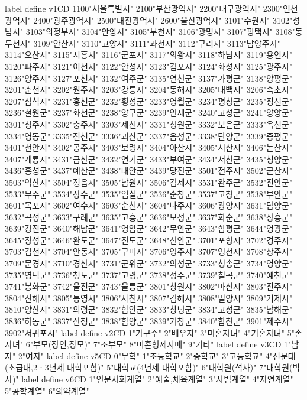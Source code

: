         label define v1CD 1100"서울특별시" 2100"부산광역시" 2200"대구광역시" 2300"인천광역시" 2400"광주광역시" 2500"대전광역시" 2600"울산광역시" 3101"수원시" 3102"성남시" 3103"의정부시" 3104"안양시" 3105"부천시" 3106"광명시" 3107"평택시" 3108"동두천시" 3109"안산시" 3110"고양시" 3111"과천시" 3112"구리시" 3113"남양주시" 3114"오산시" 3115"시흥시" 3116"군포시" 3117"의왕시" 3118"하남시" 3119"용인시" 3120"파주시" 3121"이천시" 3122"안성시" 3123"김포시" 3124"화성시" 3125"광주시" 3126"양주시" 3127"포천시" 3132"여주군" 3135"연천군" 3137"가평군" 3138"양평군" 3201"춘천시" 3202"원주시" 3203"강릉시" 3204"동해시" 3205"태백시" 3206"속초시" 3207"삼척시" 3231"홍천군" 3232"횡성군" 3233"영월군" 3234"평창군" 3235"정선군" 3236"철원군" 3237"화천군" 3238"양구군" 3239"인제군" 3240"고성군" 3241"양양군" 3301"청주시" 3302"충주시" 3303"제천시" 3331"청원군" 3332"보은군" 3333"옥천군" 3334"영동군" 3335"진천군" 3336"괴산군" 3337"음성군" 3338"단양군" 3339"증평군" 3401"천안시" 3402"공주시" 3403"보령시" 3404"아산시" 3405"서산시" 3406"논산시" 3407"계룡시" 3431"금산군" 3432"연기군" 3433"부여군" 3434"서천군" 3435"청양군" 3436"홍성군" 3437"예산군" 3438"태안군" 3439"당진군" 3501"전주시" 3502"군산시" 3503"익산시" 3504"정읍시" 3505"남원시" 3506"김제시" 3531"완주군" 3532"진안군" 3533"무주군" 3534"장수군" 3535"임실군" 3536"순창군" 3537"고창군" 3538"부안군" 3601"목포시" 3602"여수시" 3603"순천시" 3604"나주시" 3606"광양시" 3631"담양군" 3632"곡성군" 3633"구례군" 3635"고흥군" 3636"보성군" 3637"화순군" 3638"장흥군" 3639"강진군" 3640"해남군" 3641"영암군" 3642"무안군" 3643"함평군" 3644"영광군" 3645"장성군" 3646"완도군" 3647"진도군" 3648"신안군" 3701"포항시" 3702"경주시" 3703"김천시" 3704"안동시" 3705"구미시" 3706"영주시" 3707"영천시" 3708"상주시" 3709"문경시" 3710"경산시" 3731"군위군" 3732"의성군" 3733"청송군" 3734"영양군" 3735"영덕군" 3736"청도군" 3737"고령군" 3738"성주군" 3739"칠곡군" 3740"예천군" 3741"봉화군" 3742"울진군" 3743"울릉군" 3801"창원시" 3802"마산시" 3803"진주시" 3804"진해시" 3805"통영시" 3806"사천시" 3807"김해시" 3808"밀양시" 3809"거제시" 3810"양산시" 3831"의령군" 3832"함안군" 3833"창녕군" 3834"고성군" 3835"남해군" 3836"하동군" 3837"산청군" 3838"함양군" 3839"거창군" 3840"합천군" 3901"제주시" 3902"서귀포시"
        label define v2CD 1"가구주" 2"배우자" 3"미혼자녀" 4"기혼자녀" 5"손자녀" 6"부모(장인,장모)" 7"조부모" 8"미혼형제자매" 9"기타"
        label define v3CD 1"남자" 2"여자"
        label define v5CD 0"무학" 1"초등학교" 2"중학교" 3"고등학교" 4"전문대(초급대,2ㆍ3년제 대학포함)" 5"대학교(4년제 대학포함)" 6"대학원(석사)" 7"대학원(박사)"
        label define v6CD 1"인문사회계열" 2"예술,체육계열" 3"사범계열" 4"자연계열" 5"공학계열" 6"의약계열"
